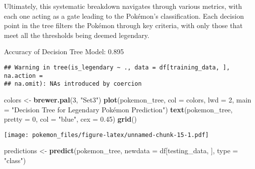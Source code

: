 \documentclass[
]{article}
\newenvironment{Shaded}{\begin{snugshade}}{\end{snugshade}}
\newcommand{\AttributeTok}[1]{\textcolor[rgb]{0.13,0.29,0.53}{#1}}
\newcommand{\DecValTok}[1]{\textcolor[rgb]{0.00,0.00,0.81}{#1}}
\newcommand{\FloatTok}[1]{\textcolor[rgb]{0.00,0.00,0.81}{#1}}
\newcommand{\FunctionTok}[1]{\textcolor[rgb]{0.13,0.29,0.53}{\textbf{#1}}}
\newcommand{\NormalTok}[1]{#1}
\newcommand{\OtherTok}[1]{\textcolor[rgb]{0.56,0.35,0.01}{#1}}
\newcommand{\SpecialCharTok}[1]{\textcolor[rgb]{0.81,0.36,0.00}{\textbf{#1}}}
\newcommand{\StringTok}[1]{\textcolor[rgb]{0.31,0.60,0.02}{#1}}
\begin{document}
Ultimately, this systematic breakdown navigates through various metrics,
with each one acting as a gate leading to the Pokémon's classification.
Each decision point in the tree filters the Pokémon through key
criteria, with only those that meet all the thresholds being deemed
legendary.

Accuracy of Decision Tree Model: 0.895

\begin{Shaded}
\end{Shaded}

\begin{verbatim}
## Warning in tree(is_legendary ~ ., data = df[training_data, ], na.action =
## na.omit): NAs introduced by coercion
\end{verbatim}

\begin{Shaded}
\begin{Highlighting}[]
\NormalTok{colors }\OtherTok{\textless{}{-}} \FunctionTok{brewer.pal}\NormalTok{(}\DecValTok{3}\NormalTok{, }\StringTok{"Set3"}\NormalTok{)}
\FunctionTok{plot}\NormalTok{(pokemon\_tree, }\AttributeTok{col =}\NormalTok{ colors, }\AttributeTok{lwd =} \DecValTok{2}\NormalTok{, }\AttributeTok{main =} \StringTok{"Decision Tree for Legendary Pokémon Prediction"}\NormalTok{)}
\FunctionTok{text}\NormalTok{(pokemon\_tree, }\AttributeTok{pretty =} \DecValTok{0}\NormalTok{, }\AttributeTok{col =} \StringTok{"blue"}\NormalTok{, }\AttributeTok{cex =} \FloatTok{0.45}\NormalTok{)}
\FunctionTok{grid}\NormalTok{()}
\end{Highlighting}
\end{Shaded}

\texttt{[image: pokemon\_files/figure-latex/unnamed-chunk-15-1.pdf]}

\begin{Shaded}
\begin{Highlighting}[]
\NormalTok{predictions }\OtherTok{\textless{}{-}} \FunctionTok{predict}\NormalTok{(pokemon\_tree, }\AttributeTok{newdata =}\NormalTok{ df[testing\_data, ], }\AttributeTok{type =} \StringTok{"class"}\NormalTok{)}
\end{Highlighting}
\end{Shaded}
\end{document}
